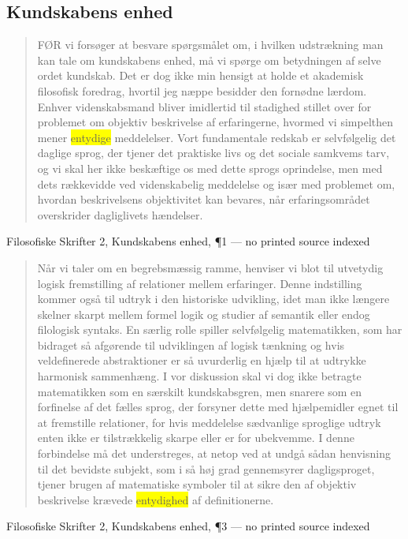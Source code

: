 \documentclass[11pt]{article}
\newcommand{\dcite}[1]{{\nopagebreak\raggedleft\small #1\par}\medskip}
\newcommand{\tlg}[1]{{\setlength{\fboxsep}{0.8pt}\colorbox{yellow}{#1}}}
\begin{document}
\subsection{Kundskabens enhed}

\begin{quote}
FØR vi forsøger at besvare spørgsmålet om, i hvilken udstrækning man kan tale om kundskabens enhed, må vi spørge om betydningen af selve ordet kundskab. Det er dog ikke min hensigt at holde et akademisk filosofisk foredrag, hvortil jeg næppe besidder den fornødne lærdom. Enhver videnskabsmand bliver imidlertid til stadighed stillet over for problemet om objektiv beskrivelse af erfaringerne, hvormed vi simpelthen mener \tlg{entydige} meddelelser. Vort fundamentale redskab er selvfølgelig det daglige sprog, der tjener det praktiske livs og det sociale samkvems tarv, og vi skal her ikke beskæftige os med dette sprogs oprindelse, men med dets rækkevidde ved videnskabelig meddelelse og især med problemet om, hvordan beskrivelsens objektivitet kan bevares, når erfaringsområdet overskrider dagliglivets hændelser.
\end{quote}
\dcite{Filosofiske Skrifter 2, Kundskabens enhed, ¶1 — no printed source indexed}

\begin{quote}
Når vi taler om en begrebsmæssig ramme, henviser vi blot til utvetydig logisk fremstilling af relationer mellem erfaringer. Denne indstilling kommer også til udtryk i den historiske udvikling, idet man ikke længere skelner skarpt mellem formel logik og studier af semantik eller endog filologisk syntaks. En særlig rolle spiller selvfølgelig matematikken, som har bidraget så afgørende til udviklingen af logisk tænkning og hvis veldefinerede abstraktioner er så uvurderlig en hjælp til at udtrykke harmonisk sammenhæng. I vor diskussion skal vi dog ikke betragte matematikken som en særskilt kundskabsgren, men snarere som en forfinelse af det fælles sprog, der forsyner dette med hjælpemidler egnet til at fremstille relationer, for hvis meddelelse sædvanlige sproglige udtryk enten ikke er tilstrækkelig skarpe eller er for ubekvemme. I denne forbindelse må det understreges, at netop ved at undgå sådan henvisning til det bevidste subjekt, som i så høj grad gennemsyrer dagligsproget, tjener brugen af matematiske symboler til at sikre den af objektiv beskrivelse krævede \tlg{entydighed} af definitionerne.
\end{quote}
\dcite{Filosofiske Skrifter 2, Kundskabens enhed, ¶3 — no printed source indexed}
\end{document}
